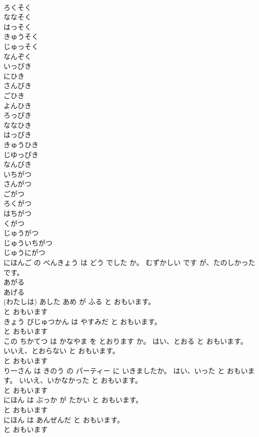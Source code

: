 \documentclass[8pt]{extreport}
\begin{document}
\begin{CJK}{UTF8}{min}
\\	ろくそく	
\\	ななそく	
\\	はっそく	
\\	きゅうそく	
\\	じゅっそく	
\\	なんぞく	
\\	いっぴき	
\\	にひき	
\\	さんびき	
\\	ごひき	
\\	よんひき	
\\	ろっぴき	
\\	ななひき	
\\	はっぴき	
\\	きゅうひき	
\\	じゆっぴき	
\\	なんびき	
\\	いちがつ	
\\	さんがつ	
\\	ごがつ	
\\	ろくがつ	
\\	はちがつ	
\\	くがつ	
\\	じゅうがつ	
\\	じゅういちがつ	
\\	じゅうにがつ	
\\	にほんご の べんきょう は どう でした か。 むずかしい です が、たのしかった です。	
\\	あがる	
\\	あげる
\\	(わたしは) あした あめ が ふる と おもいます。	
\\	と おもいます
\\	きょう びじゅつかん は やすみだ と おもいます。	
\\	と おもいます
\\	この ちかてつ は かなやま を とおります か。 はい、とおる と おもいます。 いいえ、とおらない と おもいます。	
\\	と おもいます
\\	り一さん は きのう の パーティー に いきましたか。 はい、いった と おもいます。 いいえ、いかなかった と おもいます。	
\\	と おもいます
\\	にほん は ぶっか が たかい と おもいます。	
\\	と おもいます
\\	にほん は あんぜんだ と おもいます。	
\\	と おもいます

\end{CJK}
\end{document}
